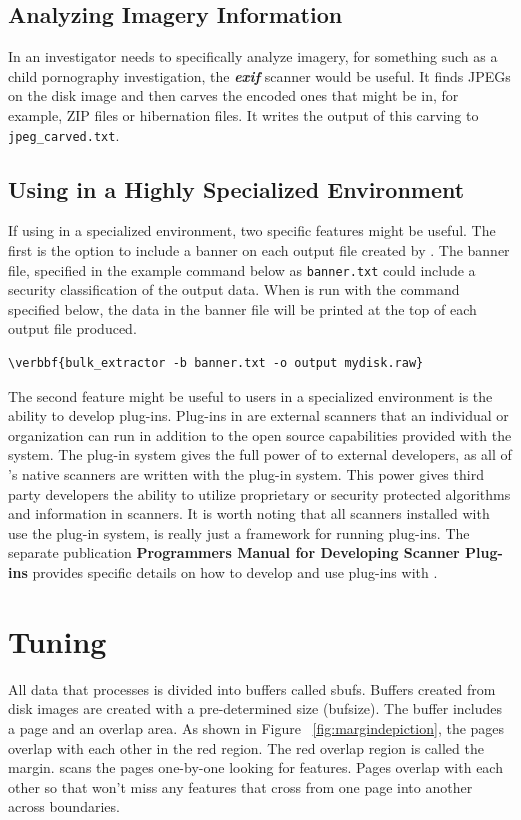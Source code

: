 \documentclass[11pt]{article} %
\begin{document}
\subsection{Analyzing Imagery Information}
\label{imagery}
In an investigator needs to specifically analyze imagery, for something such as a child pornography investigation, the \textbf{\textit{exif}} scanner would be useful. It finds JPEGs on the disk image and then carves the encoded ones that might be in, for example, ZIP files or hibernation files. It writes the output of this carving to \texttt{jpeg\_carved.txt}.

\subsection{Using \bulk in a Highly Specialized Environment}
If using \bulk in a specialized environment, two specific features might be useful.  The first is the option to include a banner on each output file created by \bulk. The banner file, specified in the example command below as \texttt{banner.txt} could include a security classification of the output data. When \bulk is run with the command specified below, the data in the banner file will be printed at the top of each output file produced.
\begin{Verbatim}[commandchars=\\\{\}]
\verbbf{bulk_extractor -b banner.txt -o output mydisk.raw}
\end{Verbatim}

The second feature might be useful to users in a specialized environment is the ability to develop plug-ins. Plug-ins in \bulk are external scanners that an individual or organization can run in addition to the open source capabilities provided with the \bulk system. The plug-in system gives the full power of \bulk to external developers, as all of \bulk's native scanners are written with the plug-in system. This power gives third party developers the ability to utilize proprietary or security protected algorithms and information in \bulk scanners. It is worth noting that all scanners installed with \bulk use the plug-in system, \bulk is really just a framework for running plug-ins.  The separate publication \textbf{Programmers Manual for Developing Scanner Plug-ins} \cite{programmersmanual} provides specific details on how to develop and use plug-ins with \bulk.

\section{Tuning \bulk}
All data that \bulk processes is divided into buffers called sbufs. Buffers created from disk images are created with a pre-determined size (bufsize). The buffer includes a page and an overlap area. As shown in Figure ~\ref{fig:margindepiction}, the pages overlap with each other in the red region. The red overlap region is called the margin. \bulk scans the pages one-by-one looking for features. Pages overlap with each other so that \bulk won't miss any features that cross from one page into another across boundaries.\\
\end{document}
